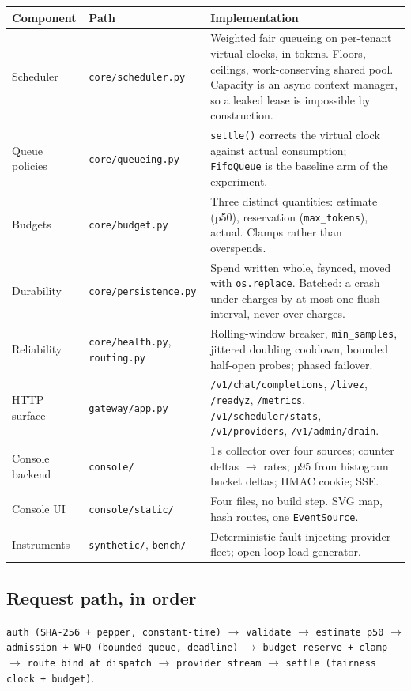 \documentclass[10pt,a4paper]{article}
\begin{document}
\begin{tabularx}{\textwidth}{@{}p{30mm}p{34mm}X@{}}
\toprule
\textbf{Component} & \textbf{Path} & \textbf{Implementation} \\
\midrule
Scheduler & \texttt{core/scheduler.py} &
  Weighted fair queueing on per-tenant virtual clocks, in tokens. Floors,
  ceilings, work-conserving shared pool. Capacity is an async context
  manager, so a leaked lease is impossible by construction. \\
Queue policies & \texttt{core/queueing.py} &
  \texttt{settle()} corrects the virtual clock against actual consumption;
  \texttt{FifoQueue} is the baseline arm of the experiment. \\
Budgets & \texttt{core/budget.py} &
  Three distinct quantities: estimate (p50), reservation
  (\texttt{max\_tokens}), actual. Clamps rather than overspends. \\
Durability & \texttt{core/persistence.py} &
  Spend written whole, fsynced, moved with \texttt{os.replace}. Batched: a
  crash under-charges by at most one flush interval, never over-charges. \\
Reliability & \texttt{core/health.py}, \texttt{routing.py} &
  Rolling-window breaker, \texttt{min\_samples}, jittered doubling cooldown,
  bounded half-open probes; phased failover. \\
HTTP surface & \texttt{gateway/app.py} &
  \texttt{/v1/chat/completions}, \texttt{/livez}, \texttt{/readyz},
  \texttt{/metrics}, \texttt{/v1/scheduler/stats}, \texttt{/v1/providers},
  \texttt{/v1/admin/drain}. \\
Console backend & \texttt{console/} &
  1\,s collector over four sources; counter deltas $\rightarrow$ rates; p95
  from histogram bucket deltas; HMAC cookie; SSE. \\
Console UI & \texttt{console/static/} &
  Four files, no build step. SVG map, hash routes, one \texttt{EventSource}. \\
Instruments & \texttt{synthetic/}, \texttt{bench/} &
  Deterministic fault-injecting provider fleet; open-loop load generator. \\
\bottomrule
\end{tabularx}

\subsection{Request path, in order}

\texttt{auth (SHA-256 + pepper, constant-time)} $\rightarrow$
\texttt{validate} $\rightarrow$ \texttt{estimate p50} $\rightarrow$
\texttt{admission + WFQ (bounded queue, deadline)} $\rightarrow$
\texttt{budget reserve + clamp} $\rightarrow$
\texttt{route bind at dispatch} $\rightarrow$
\texttt{provider stream} $\rightarrow$
\texttt{settle (fairness clock + budget)}.
\end{document}
